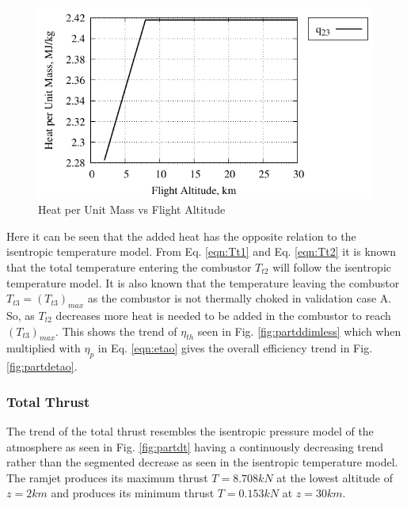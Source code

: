 \documentclass[conf]{new-aiaa} %
\begin{document}
\begin{figure}[H] %
    \centering
    \includegraphics[]{media/performance_parameter_files/part_d_heat.pdf}
    \caption{\label{fig:partdheat}Heat per Unit Mass vs Flight Altitude}
\end{figure}
Here it can be seen that the added heat has the opposite relation to the isentropic temperature model. From Eq. \ref{eqn:Tt1} and Eq. \ref{eqn:Tt2} it is known that the total temperature entering the combustor $T_{t2}$ will follow the isentropic temperature model. It is also known that the temperature leaving the combustor $T_{t3}=\left(T_{t3}\right)_{max}$ as the combustor is not thermally choked in validation case A. So, as $T_{t2}$ decreases more heat is needed to be added in the combustor to reach $\left(T_{t3}\right)_{max}$. This shows the trend of $\eta_{th}$ seen in Fig. \ref{fig:partddimless} which when multiplied with $\eta_p$ in Eq. \ref{eqn:etao} gives the overall efficiency trend in Fig. \ref{fig:partdetao}.

\subsubsection{Total Thrust}
The trend of the total thrust resembles the isentropic pressure model of the atmosphere as seen in Fig. \ref{fig:partdt} having a continuously decreasing trend rather than the segmented decrease as seen in the isentropic temperature model. The ramjet produces its maximum thrust $T=8.708kN$ at the lowest altitude of $z=2km$ and produces its minimum thrust $T=0.153kN$ at $z=30km$.
\end{document}
